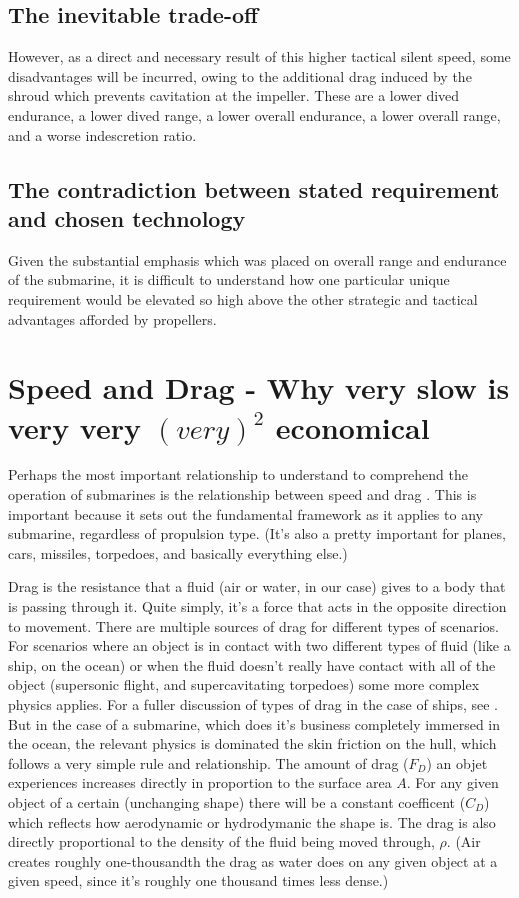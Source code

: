 \documentclass{article}\usepackage[]{graphicx}\usepackage[]{color}
\begin{document}
\subsection{The inevitable trade-off}
However, as a direct and necessary result of this higher tactical silent speed, some disadvantages will be incurred, owing to the additional drag induced by the shroud which prevents cavitation at the impeller.  These are a lower dived endurance, a lower dived range, a lower overall endurance, a lower overall range, and a worse indescretion ratio.

\subsection{The contradiction between stated requirement and chosen technology}
Given the substantial emphasis which was placed on overall range and endurance of the submarine, it is difficult to understand how one particular unique requirement would be elevated so high above the other strategic and tactical advantages afforded by propellers.

\section{Speed and Drag - Why very slow is very very $(very)^2$ economical}

Perhaps the most important relationship to understand to comprehend the operation of submarines is the relationship between speed and drag .  This is important because it sets out the fundamental framework as it applies to any submarine, regardless of propulsion type.  (It's also a pretty important for planes, cars, missiles, torpedoes, and basically everything else.)

Drag is the resistance that a fluid (air or water, in our case) gives to a body that is passing through it. Quite simply, it's a force that acts in the opposite direction to movement.  There are multiple sources of drag for different types of scenarios.  For scenarios where an object is in contact with two different types of fluid (like a ship, on the ocean) or when the fluid doesn't really have contact with all of the object (supersonic flight, and supercavitating torpedoes) some more complex physics applies. For a fuller discussion of types of drag in the case of ships, see \cite{carlton2007}.  But in the case of a submarine, which does it's business completely immersed in the ocean, the relevant physics is dominated the skin friction on the hull, which follows a very simple rule and relationship.  The amount of drag ($F_D$) an objet experiences increases directly in proportion to the surface area $A$.  For any given object of a certain (unchanging shape) there will be a constant coefficent ($C_D$) which reflects how aerodynamic or hydrodymanic the shape is.  The drag is also directly proportional to the density of the fluid being moved through, $\rho$.  (Air creates roughly one-thousandth the drag as water does on any given object at a given speed, since it's roughly one thousand times less dense.)
\end{document}
